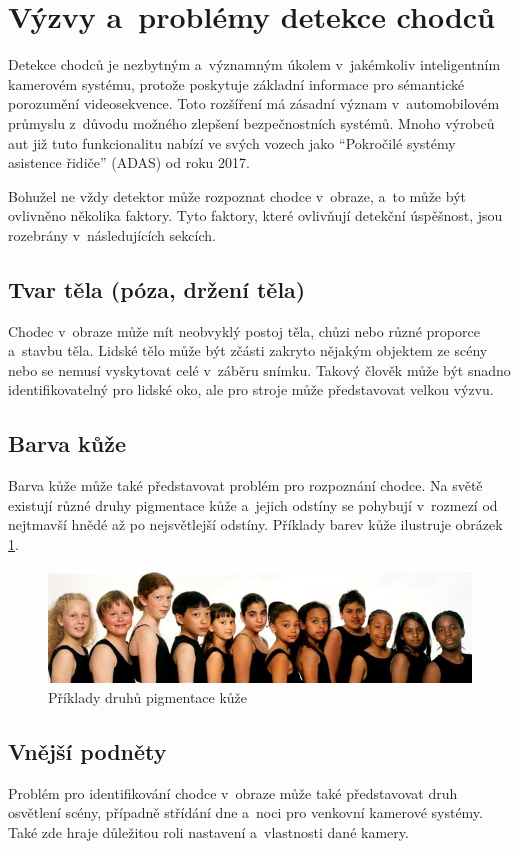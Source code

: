 \section{Výzvy a~problémy detekce chodců}
Detekce chodců je nezbytným a~významným úkolem v~jakémkoliv inteligentním kamerovém systému, protože poskytuje základní informace pro sémantické porozumění videosekvence. Toto rozšíření má zásadní význam v~automobilovém průmyslu z~důvodu možného zlepšení bezpečnostních systémů. Mnoho výrobců aut již tuto funkcionalitu nabízí ve svých vozech jako ``Pokročilé systémy asistence řidiče'' (ADAS) od roku 2017.

Bohužel ne vždy detektor může rozpoznat chodce v~obraze, a~to může být ovlivněno několika faktory. Tyto faktory, které ovlivňují detekční úspěšnost, jsou rozebrány v~následujících sekcích.

\subsection{Tvar těla (póza, držení těla)}
Chodec v~obraze může mít neobvyklý postoj těla, chůzi nebo různé proporce a~stavbu těla. Lidské tělo může být zčásti zakryto nějakým objektem ze scény nebo se nemusí vyskytovat celé v~záběru snímku. Takový člověk může být snadno identifikovatelný pro lidské oko, ale pro stroje může představovat velkou výzvu. 

\subsection{Barva kůže}
Barva kůže může také představovat problém pro rozpoznání chodce. Na světě existují různé druhy pigmentace kůže a~jejich odstíny se pohybují v~rozmezí od nejtmavší hnědé až po nejsvětlejší odstíny. Příklady barev kůže ilustruje obrázek \ref{colorskin}.

\begin{figure}[H]
\centering
\includegraphics[width=15cm]{figures/colorskin}
\caption{Příklady druhů pigmentace kůže\cite{skincolor:obr}}
\label{colorskin}
\end{figure}

\subsection{Vnější podněty}
Problém pro identifikování chodce v~obraze může také představovat druh osvětlení scény, případně střídání dne a~noci pro venkovní kamerové systémy. Také zde hraje důležitou roli nastavení a~vlastnosti dané kamery. 

